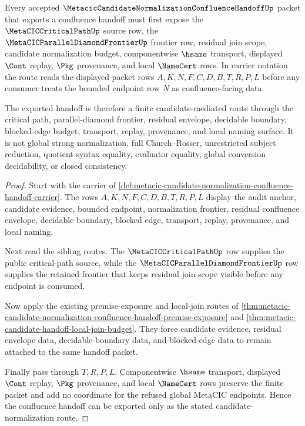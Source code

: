 \begin{theorem}
\label{thm:metacic-candidate-normalization-handoff-route}
Every accepted $\MetacicCandidateNormalizationConfluenceHandoffUp$ packet that exports a confluence handoff must first expose the $\MetaCICCriticalPathUp$ source row, the $\MetaCICParallelDiamondFrontierUp$ frontier row, residual join scope, candidate normalization budget, componentwise $\hsame$ transport, displayed $\Cont$ replay, $\Pkg$ provenance, and local $\NameCert$ rows. In carrier notation the route reads the displayed packet rows $A,K,N,F,C,D,B,T,R,P,L$ before any consumer treats the bounded endpoint row $N$ as confluence-facing data.

The exported handoff is therefore a finite candidate-mediated route through the critical path, parallel-diamond frontier, residual envelope, decidable boundary, blocked-edge budget, transport, replay, provenance, and local naming surface. It is not global strong normalization, full Church--Rosser, unrestricted subject reduction, quotient syntax equality, evaluator equality, global conversion decidability, or closed consistency.
\end{theorem}
\begin{proof}
Start with the carrier of \autoref{def:metacic-candidate-normalization-confluence-handoff-carrier}. The rows $A,K,N,F,C,D,B,T,R,P,L$ display the audit anchor, candidate evidence, bounded endpoint, normalization frontier, residual confluence envelope, decidable boundary, blocked edge, transport, replay, provenance, and local naming.

Next read the sibling routes. The $\MetaCICCriticalPathUp$ row supplies the public critical-path source, while the $\MetaCICParallelDiamondFrontierUp$ row supplies the retained frontier that keeps residual join scope visible before any endpoint is consumed.

Now apply the existing premise-exposure and local-join routes of \autoref{thm:metacic-candidate-normalization-confluence-handoff-premise-exposure} and \autoref{thm:metacic-candidate-handoff-local-join-budget}. They force candidate evidence, residual envelope data, decidable-boundary data, and blocked-edge data to remain attached to the same handoff packet.

Finally pass through $T,R,P,L$. Componentwise $\hsame$ transport, displayed $\Cont$ replay, $\Pkg$ provenance, and local $\NameCert$ rows preserve the finite packet and add no coordinate for the refused global MetaCIC endpoints. Hence the confluence handoff can be exported only as the stated candidate-normalization route.
\end{proof}
